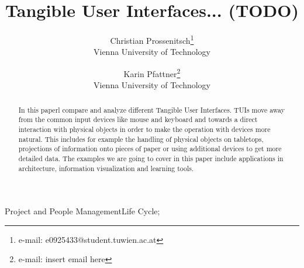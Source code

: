 \documentclass[preprint]{acmsiggraph}    %
\title{Tangible User Interfaces... (TODO)}
\author{Christian Prossenitsch\thanks{e-mail: e0925433@student.tuwien.ac.at}\\ Vienna University of Technology %
\and Karin Pfattner\thanks{e-mail: insert email here}\\ Vienna University of Technology}%
\begin{document}

\maketitle


\begin{abstract}


In this paperl compare and analyze different Tangible User Interfaces. TUIs move away from the common input devices like mouse and keyboard and towards a direct interaction with physical objects in order to make the operation with devices more natural. This includes for example the handling of physical objects on tabletops, projections of information onto pieces of paper or using additional devices to get more detailed data. The examples we are going to cover in this paper include applications in architecture, information visualization and learning tools. 



\end{abstract}


\begin{CRcatlist}
{Project and People Management}{Life Cycle};
\end{CRcatlist}

\keywordlist







\nocite{*}

\end{document}
